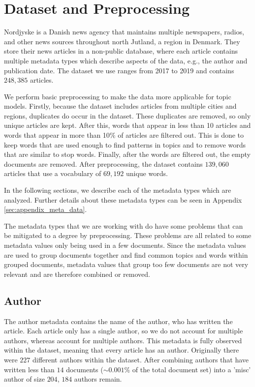 \section{Dataset and Preprocessing}\label{sec:dataset}
Nordjyske is a Danish news agency that maintains multiple newspapers, radios, and other news sources throughout north Jutland, a region in Denmark.
They store their news articles in a non-public database, where each article contains multiple metadata types which describe aspects of the data, e.g., the author and publication date.
The dataset we use ranges from 2017 to 2019 and contains $248,385$ articles.

We perform basic preprocessing to make the data more applicable for topic models.
Firstly, because the dataset includes articles from multiple cities and regions, duplicates do occur in the dataset.
These duplicates are removed, so only unique articles are kept.
After this, words that appear in less than 10 articles and words that appear in more than 10$\%$ of articles are filtered out.
This is done to keep words that are used enough to find patterns in topics and to remove words that are similar to stop words.
Finally, after the words are filtered out, the empty documents are removed.
After preprocessing, the dataset contains $139,060$ articles that use a vocabulary of $69,192$ unique words.

In the following sections, we describe each of the metadata types which are analyzed.
Further details about these metadata types can be seen in Appendix \autoref{sec:appendix_meta_data}.

The metadata types that we are working with do have some problems that can be mitigated to a degree by preprocessing.
These problems are all related to some metadata values only being used in a few documents.
Since the metadata values are used to group documents together and find common topics and words within grouped documents, metadata values that group too few documents are not very relevant and are therefore combined or removed.

\subsection{Author}
The author metadata contains the name of the author, who has written the article.
Each article only has a single author, so we do not account for multiple authors, whereas \citet{author_topic_2012} account for multiple authors.
This metadata is fully observed within the dataset, meaning that every article has an author.
Originally there were $227$ different authors within the dataset.
After combining authors that have written less than $14$ documents (${\sim}0.001\%$ of the total document set) into a 'misc' author of size $204$, $184$ authors remain.

